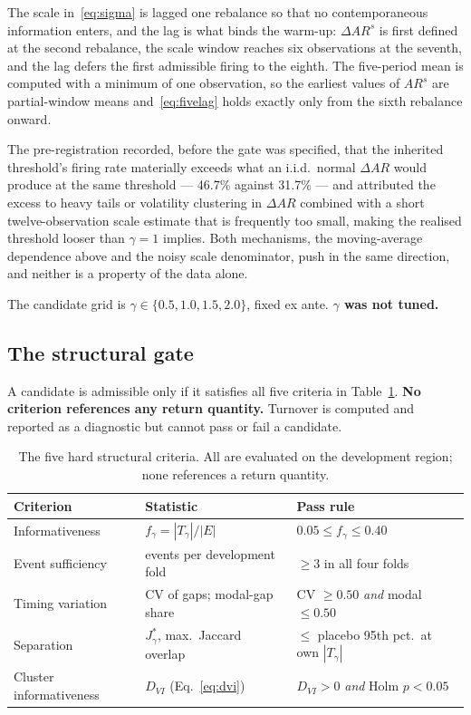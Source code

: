 \documentclass[12pt,letterpaper]{article}
\begin{document}
The scale in~\eqref{eq:sigma} is lagged one rebalance so that no contemporaneous
information enters, and the lag is what binds the warm-up: $\Delta AR^{s}$ is first
defined at the second rebalance, the scale window reaches six observations at the
seventh, and the lag defers the first admissible firing to the eighth. The
five-period mean is computed with a minimum of one observation, so the earliest
values of $AR^{s}$ are partial-window means and~\eqref{eq:fivelag} holds exactly
only from the sixth rebalance onward.

The pre-registration recorded, before the gate was specified, that the inherited
threshold's firing rate materially exceeds what an i.i.d.\ normal $\Delta AR$ would
produce at the same threshold --- 46.7\% against 31.7\% --- and attributed the
excess to heavy tails or volatility clustering in $\Delta AR$ combined with a short
twelve-observation scale estimate that is frequently too small, making the realised
threshold looser than $\gamma = 1$ implies. Both mechanisms, the moving-average
dependence above and the noisy scale denominator, push in the same direction, and
neither is a property of the data alone.

The candidate grid is $\gamma \in \{0.5, 1.0, 1.5, 2.0\}$, fixed ex ante.
\textbf{$\gamma$ was not tuned.}

\subsection{The structural gate}

A candidate is admissible only if it satisfies all five criteria in
Table~\ref{tab:gate}. \textbf{No criterion references any return quantity.}
Turnover is computed and reported as a diagnostic but cannot pass or fail a
candidate.

\begin{table}[htbp]
\centering
\caption{The five hard structural criteria. All are evaluated on the development
region; none references a return quantity.}
\label{tab:gate}
\small
\begin{tabular}{lll}
\toprule
Criterion & Statistic & Pass rule \\
\midrule
Informativeness & $f_\gamma = |T_\gamma| / |E|$ & $0.05 \leq f_\gamma \leq 0.40$ \\
Event sufficiency & events per development fold & $\geq 3$ in all four folds \\
Timing variation & CV of gaps; modal-gap share & CV $\geq 0.50$ \emph{and} modal $\leq 0.50$ \\
Separation & $J^{*}_\gamma$, max.\ Jaccard overlap & $\leq$ placebo 95th pct.\ at own $|T_\gamma|$ \\
Cluster informativeness & $D_{VI}$ (Eq.~\ref{eq:dvi}) & $D_{VI} > 0$ \emph{and} Holm $p < 0.05$ \\
\bottomrule
\end{tabular}
\end{table}
\end{document}
